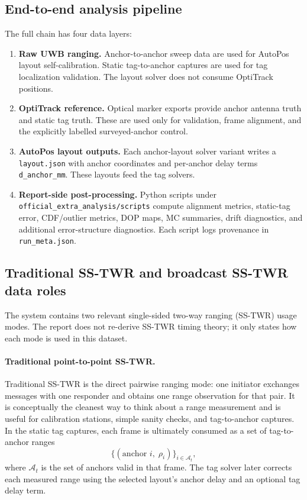 \documentclass[11pt,a4paper]{article}
\begin{document}
\subsection{End-to-end analysis pipeline}
The full chain has four data layers:
\begin{enumerate}[leftmargin=1.6em]
  \item \textbf{Raw UWB ranging.} Anchor-to-anchor sweep data are used for AutoPos layout
        self-calibration. Static tag-to-anchor captures are used for tag localization
        validation. The layout solver does not consume OptiTrack positions.
  \item \textbf{OptiTrack reference.} Optical marker exports provide anchor antenna truth
        and static tag truth. These are used only for validation, frame alignment, and the
        explicitly labelled surveyed-anchor control.
  \item \textbf{AutoPos layout outputs.} Each anchor-layout solver variant writes a
        \texttt{layout.json} with anchor coordinates and per-anchor delay terms
        \texttt{d\_anchor\_mm}. These layouts feed the tag solvers.
  \item \textbf{Report-side post-processing.} Python scripts under
        \texttt{official\_extra\_analysis/scripts} compute alignment metrics, static-tag
        error, CDF/outlier metrics, DOP maps, MC summaries, drift diagnostics, and
        additional error-structure diagnostics. Each script logs provenance in
        \texttt{run\_meta.json}.
\end{enumerate}

\subsection{Traditional SS-TWR and broadcast SS-TWR data roles}
\label{sec:sstwrmethod}
The system contains two relevant single-sided two-way ranging (SS-TWR) usage modes. The
report does not re-derive SS-TWR timing theory; it only states how each mode is used in this
dataset.

\paragraph{Traditional point-to-point SS-TWR.}
Traditional SS-TWR is the direct pairwise ranging mode: one initiator exchanges messages
with one responder and obtains one range observation for that pair. It is conceptually the
cleanest way to think about a range measurement and is useful for calibration stations,
simple sanity checks, and tag-to-anchor captures. In the static tag captures, each frame is
ultimately consumed as a set of tag-to-anchor ranges
\[
  \{(\text{anchor }i,\; \rho_i)\}_{i\in \mathcal{A}_t},
\]
where $\mathcal{A}_t$ is the set of anchors valid in that frame. The tag solver later
corrects each measured range using the selected layout's anchor delay and an optional tag
delay term.
\end{document}
